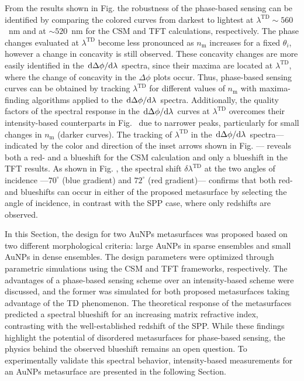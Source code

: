 From the results shown in Fig.   the robustness of the phase-based sensing can be identified by comparing the colored curves from darkest to lightest at $\lambda^\text{TD} \sim 560$~nm and at $\sim 520$~nm for the CSM and TFT calculations, respectively. The phase changes evaluated at $\lambda^\text{TD}$ become less pronounced as $n_\text{m}$ increases for a fixed $\theta_i$, however a change in concavity is still observed. These concavity changes are more easily identified in the $\dv*{\Delta\phi}{\lambda}$ spectra, since their maxima  are located at $\lambda^\text{TD}$, where the change of concavity in the $\Delta\phi$ plots occur. Thus, phase-based sensing curves can be obtained by tracking $\lambda^\text{TD}$ for different values of $n_\text{m}$ with maxima-finding algorithms applied to the $\dv*{\Delta\phi}{\lambda}$ spectra. Additionally, the quality factors of the spectral response  in the $\dv*{\Delta\phi}{\lambda}$ curves at $\lambda^\text{TD}$ overcomes their intensity-based counterparts in Fig.~ due to narrower peaks, particularly for small changes in $n_\text{m}$ (darker curves). The tracking of  $\lambda^\text{TD}$  in the $\dv*{\Delta\phi}{\lambda}$ spectra---indicated by the color and direction of the inset arrows shown in Fig. --- reveals both  a red- and a blueshift for the CSM calculation and only a blueshift in the TFT results. As shown in Fig. , the spectral shift $\delta\lambda^\text{TD}$ at the two angles of incidence ---$70^\circ$ (blue gradient) and $72^\circ$ (red gradient)--- confirms that both red- and blueshifts  can occur in either of the proposed metasurface by selecting the angle of incidence, in contrast with the SPP case, where only redshifts are observed.

In this Section, the design for two AuNPs metasurfaces was proposed based on two different morphological criteria: large AuNPs in sparse ensembles and small AuNPs in dense ensembles. The design parameters were optimized through parametric simulations using the CSM and TFT frameworks, respectively. The advantages of a phase-based sensing scheme over an intensity-based scheme were discussed, and the former was simulated for both proposed metasurfaces taking advantage of the TD phenomenon. The theoretical response of the metasurfaces predicted a spectral blueshift for an increasing matrix refractive index, contrasting with the well-established redshift of the SPP. While these findings highlight the potential of disordered metasurfaces for phase-based sensing, the physics behind the observed blueshift remains an open question. To experimentally validate this spectral behavior, intensity-based measurements for an AuNPs metasurface are presented in the following Section.


















